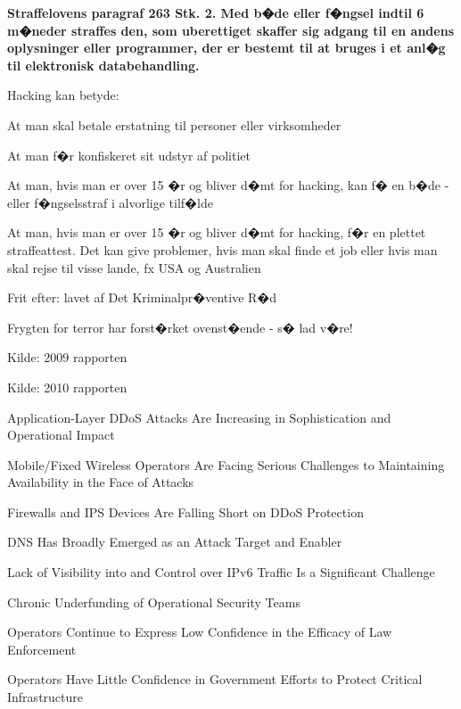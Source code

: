 \documentclass[20pt,landscape,a4paper,footrule]{foils}
\begin{document}

{\bfseries Straffelovens paragraf 263 Stk. 2. Med b�de eller f�ngsel
  indtil 6 m�neder
straffes den, som uberettiget skaffer sig adgang til en andens
oplysninger eller programmer, der er bestemt til at bruges i et anl�g
til elektronisk databehandling.}

Hacking kan betyde:
\begin{list2}
\item At man skal betale erstatning til personer eller virksomheder
\item At man f�r konfiskeret sit udstyr af politiet
\item At man, hvis man er over 15 �r og bliver d�mt for hacking, kan
  f� en b�de - eller f�ngselsstraf i alvorlige tilf�lde
\item At man, hvis man er over 15 �r og bliver d�mt for hacking, f�r
en plettet straffeattest. Det kan give problemer, hvis man skal finde
et job eller hvis man skal rejse til visse lande, fx USA og
Australien
\item Frit efter:  lavet af Det
  Kriminalpr�ventive R�d
\item Frygten for terror har forst�rket ovenst�ende - s� lad v�re!
\end{list2}






Kilde:
 2009 rapporten





Kilde:
 2010 rapporten



\begin{list2}
\item Application-Layer DDoS Attacks Are Increasing in Sophistication and Operational Impact
\item Mobile/Fixed Wireless Operators Are Facing Serious Challenges to Maintaining Availability in the Face of Attacks
\item Firewalls and IPS Devices Are Falling Short on DDoS Protection
\item DNS Has Broadly Emerged as an Attack Target and Enabler
\item Lack of Visibility into and Control over IPv6 Traffic Is a Significant Challenge
\item Chronic Underfunding of Operational Security Teams
\item Operators Continue to Express Low Confidence in the Efficacy of Law Enforcement
\item Operators Have Little Confidence in Government Efforts to Protect Critical Infrastructure
\end{list2}
\end{document}
